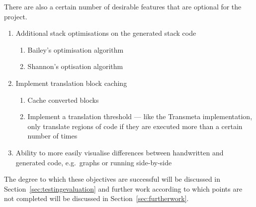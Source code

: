 \noindent There are also a certain number of desirable features that are
optional for the project.

\begin{enumerate}[noitemsep,resume,label=R\arabic*]
  \item Additional stack optimisations on the generated stack
    code\label{itm:moreoptimise}
  \begin{enumerate}[noitemsep,label=\theenumi.\arabic*]
    \item Bailey's optimisation algorithm
    \item Shannon's optisation algorithm
  \end{enumerate}
  \item Implement translation block caching\label{itm:caching}
  \begin{enumerate}[noitemsep,label=\theenumi.\arabic*]
    \item Cache converted blocks
    \item Implement a translation threshold --- like the Transmeta
      implementation, only translate regions of code if they are executed more
      than a certain number of times
  \end{enumerate}
  \item Ability to more easily visualise differences between handwritten and
    generated code, e.g.\ graphs or running side-by-side\label{itm:visualise}
\end{enumerate}

The degree to which these objectives are successful will be discussed in
Section~\ref{sec:testingevaluation} and further work according to which points
are not completed will be discussed in Section~\ref{sec:furtherwork}.
